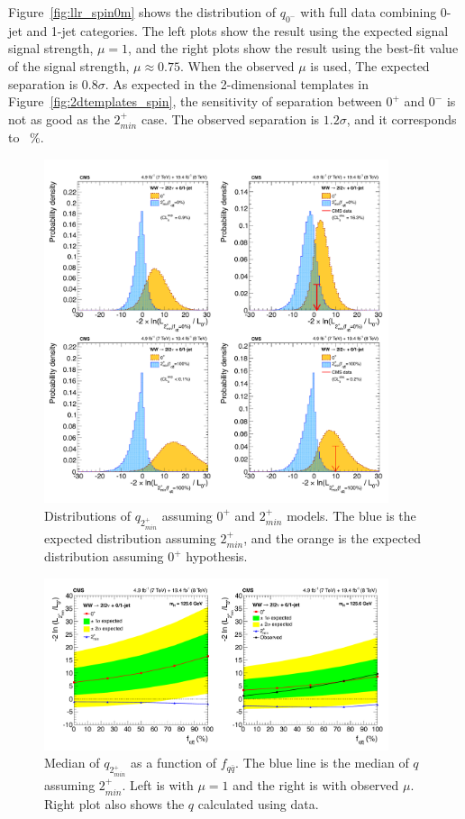 Figure~\ref{fig:llr_spin0m} shows the distribution of $q_{0^-}$ with full data 
combining 0-jet and 1-jet categories. 
The left plots show the result using the expected signal signal strength, $\mu=1$, 
and the right plots show the result using the best-fit value of the signal strength, 
$\mu \approx 0.75$.  
When the observed $\mu$ is used, The expected separation is $0.8\sigma$.  
As expected in the 2-dimensional templates in Figure~\ref{fig:2dtemplates_spin},
the sensitivity of separation between $0^+$ and $0^-$ is 
not as good as the $2_{min}^+$ case.
The observed separation is $1.2\sigma$, and it corresponds to ~\%. 

%
\begin{figure}[ht!] 
\centering 
\includegraphics[width=0.9\textwidth]{figures/spin2LLR.pdf}
\caption{Distributions of $q_{2_{min}^+}$ assuming $0^+$ and $2_{min}^+$ models.  
The blue is the expected distribution assuming 
$2_{min}^+$, and the orange is the expected distribution assuming $0^+$ hypothesis. }
\label{fig:llr_spin2} 
\end{figure} 
%
\begin{figure}[ht!] 
\centering 
\includegraphics[width=0.9\textwidth]{figures/spinLLRband.pdf}
\caption{Median of $q_{2_{min}^+}$ as a function of $f_{q\bar{q}}$. 
The blue line is the median of $q$ assuming $2_{min}^+$.
Left is with $\mu=1$ and the right is with observed $\mu$.
Right plot also shows the $q$ calculated using data. 
} 
\label{fig:llr_band} 
\end{figure} 
